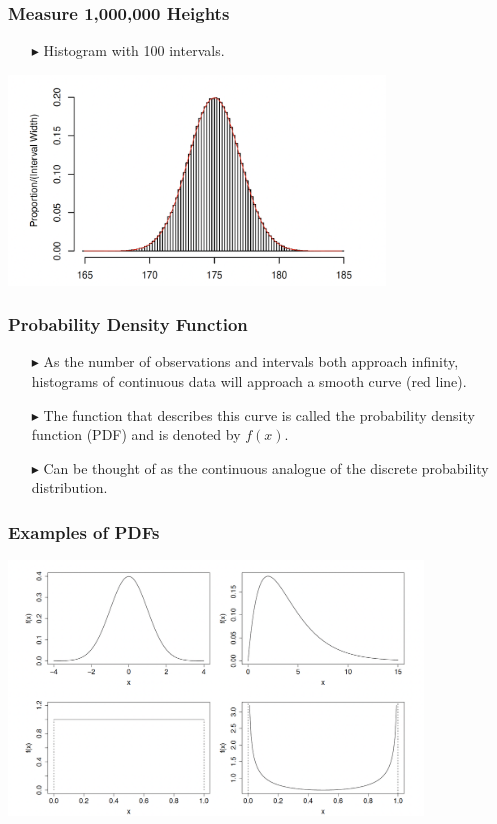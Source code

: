 \documentclass[12pt]{beamer}
\begin{document}
\begin{frame}
	\frametitle{Measure 1,000,000 Heights}
		\begin{itemize}
		\item[\color{blue}$\blacktriangleright$] Histogram with 100 intervals.
	\end{itemize}
	\centering
	\includegraphics[width=10cm]{histo5.png}
\end{frame}

\begin{frame}
	\frametitle{Probability Density Function}
	\begin{itemize}
		\item[\color{blue}$\blacktriangleright$] As the number of observations and intervals both approach infinity, histograms of continuous data will approach a smooth curve (red line).
		\item[\color{blue}$\blacktriangleright$] The function that describes this curve is called the probability density function (PDF) and is denoted by $f(x)$.
		\item[\color{blue}$\blacktriangleright$] Can be thought of as the continuous analogue of the discrete probability distribution.
	\end{itemize}

\end{frame}
\begin{frame}
	\frametitle{Examples of PDFs}
	\centering
	\includegraphics[width=11cm]{pdf.png}
\end{frame}
\end{document}
